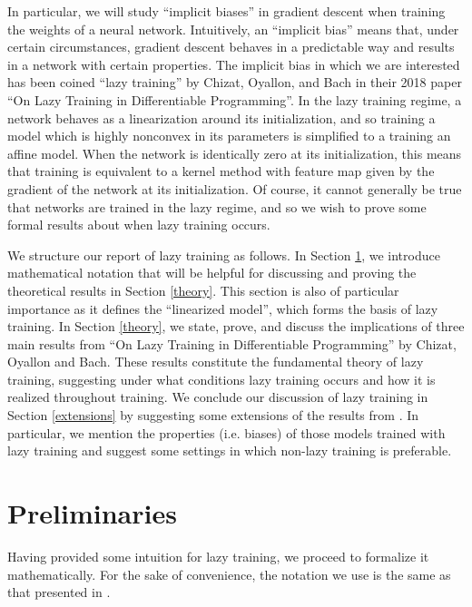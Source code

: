 \documentclass{article}
\begin{document}
In particular, we will study \enquote{implicit biases} in gradient descent when training the weights of a neural network. Intuitively, an \enquote{implicit bias} means that, under certain circumstances, gradient descent behaves in a predictable way and results in a network with certain properties. The implicit bias in which we are interested has been coined \enquote{lazy training} by Chizat, Oyallon, and Bach in their 2018 paper \enquote{On Lazy Training in Differentiable Programming}. In the lazy training regime, a network behaves as a linearization around its initialization, and so training a model which is highly nonconvex in its parameters is simplified to a training an affine model. When the network is identically zero at its initialization, this means that training is equivalent to a kernel method with feature map given by the gradient of the network at its initialization. Of course, it cannot generally be true that networks are trained in the lazy regime, and so we wish to prove some formal results about when lazy training occurs.

We structure our report of lazy training as follows. In Section \ref{prelim}, we introduce mathematical notation that will be helpful for discussing and proving the theoretical results in Section \ref{theory}. This section is also of particular importance as it defines the \enquote{linearized model}, which forms the basis of lazy training. In Section \ref{theory}, we state, prove, and discuss the implications of three main results from \enquote{On Lazy Training in Differentiable Programming} by Chizat, Oyallon and Bach. These results constitute the fundamental theory of lazy training, suggesting under what conditions lazy training occurs and how it is realized throughout training. We conclude our discussion of lazy training in Section \ref{extensions} by suggesting some extensions of the results from \cite{chizat2018lazy}. In particular, we mention the properties (i.e. biases) of those models trained with lazy training and suggest some settings in which non-lazy training is preferable.

\section{Preliminaries}\label{prelim}

Having provided some intuition for lazy training, we proceed to formalize it mathematically. For the sake of convenience, the notation we use is the same as that presented in \cite{chizat2018lazy}.
\end{document}
